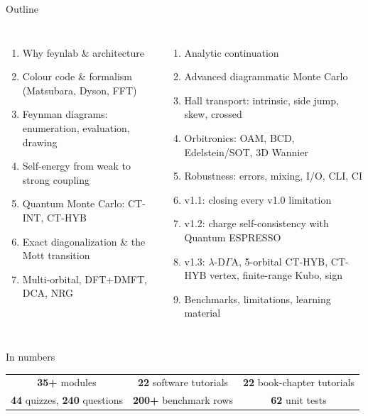 \documentclass[aspectratio=169,10pt]{beamer}
\begin{document}
\begin{frame}{Outline}
\begin{columns}[T]
\begin{enumerate}\small
 \item Why feynlab \& architecture
 \item Colour code \& formalism (Matsubara, Dyson, FFT)
 \item Feynman diagrams: enumeration, evaluation, drawing
 \item Self-energy from weak to strong coupling
 \item Quantum Monte Carlo: CT-INT, CT-HYB
 \item Exact diagonalization \& the Mott transition
 \item Multi-orbital, DFT+DMFT, DCA, NRG
\end{enumerate}
\begin{enumerate}\small\setcounter{enumi}{7}
 \item Analytic continuation
 \item Advanced diagrammatic Monte Carlo
 \item Hall transport: intrinsic, side jump, skew, crossed
 \item Orbitronics: OAM, BCD, Edelstein/SOT, 3D Wannier
 \item Robustness: errors, mixing, I/O, CLI, CI
 \item v1.1: closing every v1.0 limitation
 \item v1.2: charge self-consistency with Quantum ESPRESSO
 \item v1.3: $\lambda$-D$\Gamma$A, 5-orbital CT-HYB, CT-HYB vertex, finite-range Kubo, sign
 \item Benchmarks, limitations, learning material
\end{enumerate}
\end{columns}
\vfill
\begin{block}{In numbers}
\centering
\small
\begin{tabular}{ccc}
\textbf{35+} modules & \textbf{22} software tutorials & \textbf{22} book-chapter tutorials\\
\textbf{44} quizzes, \textbf{240} questions & \textbf{200+} benchmark rows & \textbf{62} unit tests
\end{tabular}
\end{block}
\end{frame}

\end{document}
